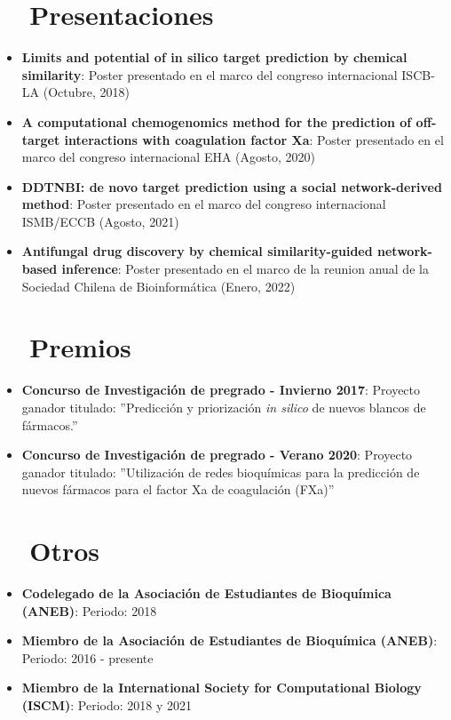 \documentclass[letter,20pt]{article}
\newcommand{\resumeItem}[2]{
  \item\small{
    \textbf{#1}{: #2 \vspace{-2pt}}
  }
}
\newcommand{\resumeSubItem}[2]{\resumeItem{#1}{#2}\vspace{-3pt}}
\newcommand{\resumeSubHeadingListStart}{\begin{itemize}[leftmargin=*]}
\newcommand{\resumeSubHeadingListEnd}{\end{itemize}}
\begin{document}
\section{~~Presentaciones}
\resumeSubHeadingListStart
\resumeSubItem{Limits and potential of in silico target prediction by chemical similarity}{Poster presentado en el marco del congreso internacional ISCB-LA (Octubre, 2018)}
\vspace{2pt}
\resumeSubItem{A computational chemogenomics method for the prediction of off-target interactions with coagulation factor Xa}{Poster presentado en el marco del congreso internacional EHA (Agosto, 2020)}
\vspace{2pt}
\resumeSubItem{DDTNBI: de novo target prediction using a social network-derived method}{Poster presentado en el marco del congreso internacional ISMB/ECCB (Agosto, 2021)}
\vspace{2pt}
\resumeSubItem{Antifungal drug discovery by chemical similarity-guided network-based inference}{Poster presentado en el marco de la reunion anual de la Sociedad Chilena de Bioinformática (Enero, 2022)}
\resumeSubHeadingListEnd
\vspace{-5pt}
\section{~~Premios}
\resumeSubHeadingListStart
\resumeSubItem{Concurso de Investigación de pregrado - Invierno 2017}{Proyecto ganador titulado: ''Predicción y priorización \textit{in silico} de nuevos blancos de fármacos.''}
\vspace{2pt}
\resumeSubItem{Concurso de Investigación de pregrado - Verano 2020}{Proyecto ganador titulado: ''Utilización de redes bioquímicas para la predicción de nuevos fármacos para el factor Xa de coagulación (FXa)''}
\vspace{2pt}
\resumeSubHeadingListEnd
\section{~~Otros}
\resumeSubHeadingListStart
\resumeSubItem{Codelegado de la Asociación de Estudiantes de Bioquímica (ANEB)}{Periodo: 2018}
\vspace{2pt}
\resumeSubItem{Miembro de la Asociación de Estudiantes de Bioquímica (ANEB)}{Periodo: 2016 - presente}
\vspace{2pt}
\resumeSubItem{Miembro de la International Society for Computational Biology (ISCM)}{Periodo: 2018 y 2021}
\vspace{2pt}
\resumeSubHeadingListEnd
\end{document}
